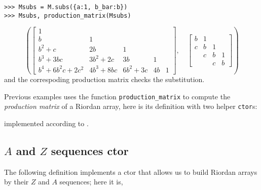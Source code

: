 \begin{example}
\begin{verbatim}
>>> Msubs = M.subs({a:1, b_bar:b})
>>> Msubs, production_matrix(Msubs)
\end{verbatim}
\begin{displaymath}
\left ( \left[\begin{matrix}1 &   &   &   &  \\b & 1 &   &   &  \\b^{2} + c & 2 b & 1 &   &  \\b^{3} + 3 b c & 3 b^{2} + 2 c & 3 b & 1 &  \\b^{4} + 6 b^{2} c + 2 c^{2} & 4 b^{3} + 8 b c & 6 b^{2} + 3 c & 4 b & 1\end{matrix}\right], \quad \left[\begin{matrix}b & 1 &   &  \\c & b & 1 &  \\  & c & b & 1\\  &   & c & b\end{matrix}\right]\right )
\end{displaymath}
and the correspoding production matrix checks the substitution.
\end{example}

Previous examples uses the function \verb|production_matrix| to compute the
\textit{production matrix} \citep{DEUTSCH2005101,Deutsch2009} of a Riordan
array, here is its definition with two helper \verb|ctor|s:


implemented according to \citep[page~$215$]{barry2017riordan}.
\vfill

\subsection{$A$ and $Z$ sequences ctor}

The following definition implements a ctor that allows us to build Riordan
arrays by their $Z$ and $A$ sequences; here it is,


